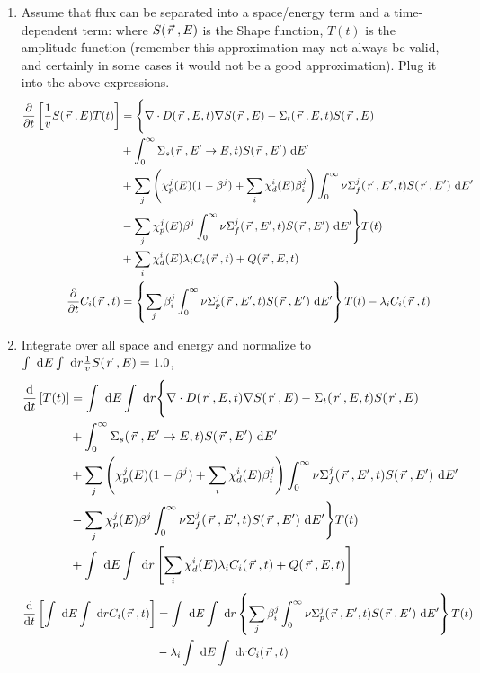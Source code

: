 \documentclass{school-22.211-notes}
\begin{document}
\begin{enumerate}
\item Assume that flux can be separated into a space/energy term and a time-dependent term: 
where $S(\left.\vec{r}\right., E)$ is the Shape function,  $T(t)$ is the amplitude function (remember this approximation may not always be valid, and certainly in some cases it would not be a good approximation). Plug it into the above expressions. 
  \begin{align}
    \frac{\partial}{\partial t} \left[ \frac{1}{v} S(\left.\vec{r}\right., E) T(t) \right] &= 
    \Bigg\{ \nabla \cdot D(\left.\vec{r}\right., E, t) \nabla S(\left.\vec{r}\right., E) - \Sigma_t (\left.\vec{r}\right., E, t) S(\left.\vec{r}\right., E)   \notag \\
    & + \int_0^{\infty} \Sigma_s (\left.\vec{r}\right., E'\to E, t) S(\left.\vec{r}\right., E') \mbox{ }\mathrm{d} E'   \notag \\
    &+ \displaystyle\sum_j \left( \chi_p^j (E) (1-\beta^j) + \displaystyle\sum_i \chi_d^i (E) \beta_i^j \right) \int_0^{\infty} \nu \Sigma_f^j (\left.\vec{r}\right., E', t) S(\left.\vec{r}\right., E') \mbox{ }\mathrm{d} E'   \notag \\
    &- \displaystyle\sum_j \chi_p^j (E) \beta^j \int_0^{\infty} \nu \Sigma_f^j (\left.\vec{r}\right., E', t) S(\left.\vec{r}\right., E') \mbox{ }\mathrm{d} E' \Bigg\} T(t)  \notag \\
    &+ \displaystyle\sum_i \chi_d^i (E) \lambda_i C_i (\left.\vec{r}\right., t) + Q(\left.\vec{r}\right., E, t)   \\
    \frac{\partial}{\partial t} C_i (\left.\vec{r}\right., t) &= \left\{ \displaystyle\sum_j \beta_i^j \int_0^{\infty} \nu \Sigma_p^j (\left.\vec{r}\right., E', t) S(\left.\vec{r}\right., E') \mbox{ }\mathrm{d} E' \right\} T(t) - \lambda_i C_i (\left.\vec{r}\right., t) 
  \end{align}


\item Integrate over all space and energy and normalize to $\int \mbox{ }\mathrm{d} E \int \mbox{ }\mathrm{d} r \frac{1}{v} S(\left.\vec{r}\right., E) = 1.0$, 
  \begin{align}
    \frac{\mathrm{d}}{\mathrm{d}t} \left[ T(t) \right] &= 
    \int \mbox{ }\mathrm{d} E \int \mbox{ }\mathrm{d} r \Bigg\{ \nabla \cdot D(\left.\vec{r}\right., E, t) \nabla S(\left.\vec{r}\right., E) - \Sigma_t (\left.\vec{r}\right., E, t) S(\left.\vec{r}\right., E)   \notag \\
    & + \int_0^{\infty} \Sigma_s (\left.\vec{r}\right., E'\to E, t) S(\left.\vec{r}\right., E') \mbox{ }\mathrm{d} E'   \notag \\
    &+ \displaystyle\sum_j \left( \chi_p^j (E) (1-\beta^j) + \displaystyle\sum_i \chi_d^i (E) \beta_i^j \right) \int_0^{\infty} \nu \Sigma_f^j (\left.\vec{r}\right., E', t) S(\left.\vec{r}\right., E') \mbox{ }\mathrm{d} E'   \notag \\
    &- \displaystyle\sum_j \chi_p^j (E) \beta^j \int_0^{\infty} \nu \Sigma_f^j (\left.\vec{r}\right., E', t) S(\left.\vec{r}\right., E') \mbox{ }\mathrm{d} E' \Bigg\} T(t)  \notag \\
    &+ \int \mbox{ }\mathrm{d} E \int \mbox{ }\mathrm{d} r \left[ \displaystyle\sum_i \chi_d^i (E) \lambda_i C_i (\left.\vec{r}\right., t) + Q(\left.\vec{r}\right., E, t)\right]   
  \end{align}
  \begin{align}
    \frac{\mathrm{d}}{\mathrm{d}t} \left[ \int \mbox{ }\mathrm{d} E \int \mbox{ }\mathrm{d} r C_i (\left.\vec{r}\right., t) \right] &= \int \mbox{ }\mathrm{d} E \int \mbox{ }\mathrm{d} r \left\{ \displaystyle\sum_j \beta_i^j \int_0^{\infty} \nu \Sigma_p^j (\left.\vec{r}\right., E', t) S(\left.\vec{r}\right., E') \mbox{ }\mathrm{d} E' \right\} T(t) \notag \\
    &- \lambda_i \int \mbox{ }\mathrm{d} E \int \mbox{ }\mathrm{d} r C_i (\left.\vec{r}\right., t) 
  \end{align}



\end{enumerate}
\end{document}
